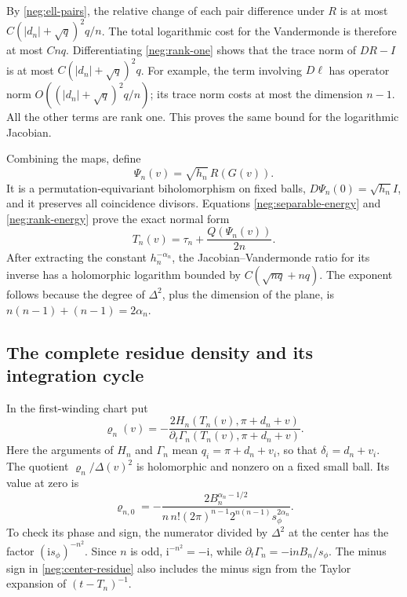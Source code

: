 \documentclass[11pt]{article}
\numberwithin{equation}{section}
\theoremstyle{definition}
\newcommand{\ii}{\mathrm i}
\begin{document}
By \eqref{neg:ell-pairs}, the relative change of each pair
difference under \(R\) is at most
\(C(|d_n|+\sqrt q)^2q/n\).
The total logarithmic cost for the Vandermonde is therefore
at most \(Cnq\).  Differentiating \eqref{neg:rank-one}
shows that the trace norm of \(DR-I\) is at most
\(C(|d_n|+\sqrt q)^2q\).  For example, the term involving
\(D\ell\) has operator norm \(O((|d_n|+\sqrt q)^2q/n)\);
its trace norm costs at most the dimension \(n-1\).
All the other terms are rank one.  This proves the same
bound for the logarithmic Jacobian.

Combining the maps, define
\begin{equation}
 \Psi_n(v)=\sqrt{h_n}\,R(G(v)).
 \label{neg:Psi}
\end{equation}
It is a permutation-equivariant biholomorphism on fixed
balls, \(D\Psi_n(0)=\sqrt{h_n}I\), and it preserves all
coincidence divisors.  Equations
\eqref{neg:separable-energy} and \eqref{neg:rank-energy}
prove the exact normal form
\begin{equation}
 T_n(v)=\tau_n+\frac{Q(\Psi_n(v))}{2n}.
 \label{neg:exact-quadratic}
\end{equation}
After extracting the constant \(h_n^{-\alpha_n}\), the
Jacobian--Vandermonde ratio for its inverse has a
holomorphic logarithm bounded by
\(C(\sqrt{nq}+nq)\).  The exponent follows because the
degree of \(\Delta^2\), plus the dimension of the plane,
is \(n(n-1)+(n-1)=2\alpha_n\).

\subsection{The complete residue density and its integration cycle}
\label{neg:density-cycle}

In the first-winding chart put
\[
 \varrho_n(v)=
 -\frac{2H_n(T_n(v),\pi+d_n+v)}
        {\partial_t\Gamma_n(T_n(v),\pi+d_n+v)} .
 \]
Here the arguments of \(H_n\) and \(\Gamma_n\) mean
\(q_i=\pi+d_n+v_i\), so that \(\delta_i=d_n+v_i\).
The quotient
\(\varrho_n/\Delta(v)^2\) is holomorphic and nonzero on a
fixed small ball.  Its value at zero is
\begin{equation}
 \varrho_{n,0}=
 -\frac{2B_n^{\alpha_n-1/2}}
 {n\,n!(2\pi)^{n-1}2^{n(n-1)}s_\phi^{2\alpha_n}} .
 \label{neg:center-residue}
\end{equation}
To check its phase and sign, the numerator divided by
\(\Delta^2\) at the center has the factor
\((\ii s_\phi)^{-n^2}\).
Since \(n\) is odd, \(\ii^{-n^2}=-\ii\), while
\(\partial_t\Gamma_n=-\ii nB_n/s_\phi\).
The minus sign in \eqref{neg:center-residue} also includes
the minus sign from the Taylor expansion of \((t-T_n)^{-1}\).
\end{document}

